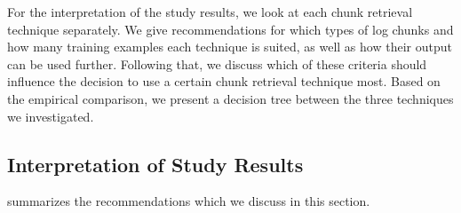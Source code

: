 For the interpretation of the study results, we look at each chunk
retrieval technique separately.
We give recommendations for
which types of log chunks and how many training examples
each technique is suited, as well as
how their output can be used further.
Following that, we discuss
which of these criteria should influence the decision to use a certain
chunk retrieval technique most.
Based on the empirical comparison, we present a
decision tree between the three techniques we investigated.

\subsection{Interpretation of Study Results}
 summarizes the
recommendations which we discuss
in this section.

\begin{table}[tbp]
\caption{Recommendations for each of the investigated chunk retrieval
techniques.}
\label{tab:single-technique-recommendations}
\end{table}

